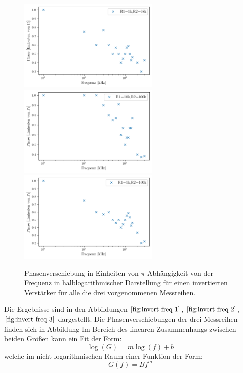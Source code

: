 \begin{figure}
\centering
\includegraphics[width=0.6\textwidth]{Operationsverstärker Phase1}
\includegraphics[width=0.6\textwidth]{Operationsverstärker Phase2}
\includegraphics[width=0.6\textwidth]{Operationsverstärker Phase3}
\label{fig:invert freq Ph}
\caption{Phasenverschiebung in Einheiten von $\pi$ Abhängigkeit von der Frequenz in halblogarithmischer Darstellung für einen invertierten Verstärker für alle die drei vorgenommenen Messreihen.}
\end{figure}
Die Ergebnisse sind in den Abbildungen $\ref{fig:invert freq 1}$, $\ref{fig:invert freq 2}$, $\ref{fig:invert freq 3}$ dargestellt. Die Phasenverschiebungen der drei Messreihen finden sich in Abbildung 
Im Bereich des linearen Zusammenhangs zwischen beiden Größen kann ein Fit der Form:
\begin{equation}
\log(G)=m\log(f)+b
\end{equation}
welche im nicht logarithmischen Raum einer Funktion der Form:
\begin{equation}
G(f)=Bf^m
\end{equation}
